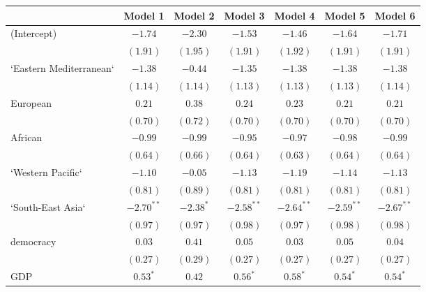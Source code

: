 
\begin{table}[!h]
\begin{center}
\begin{tabular}{l c c c c c c }
\toprule
 & Model 1 & Model 2 & Model 3 & Model 4 & Model 5 & Model 6 \\
\midrule
(Intercept)             & $-1.74$      & $-2.30$      & $-1.53$      & $-1.46$      & $-1.64$      & $-1.71$      \\
                        & $(1.91)$     & $(1.95)$     & $(1.91)$     & $(1.92)$     & $(1.91)$     & $(1.91)$     \\
`Eastern Mediterranean` & $-1.38$      & $-0.44$      & $-1.35$      & $-1.38$      & $-1.38$      & $-1.38$      \\
                        & $(1.14)$     & $(1.14)$     & $(1.13)$     & $(1.13)$     & $(1.13)$     & $(1.14)$     \\
European                & $0.21$       & $0.38$       & $0.24$       & $0.23$       & $0.21$       & $0.21$       \\
                        & $(0.70)$     & $(0.72)$     & $(0.70)$     & $(0.70)$     & $(0.70)$     & $(0.70)$     \\
African                 & $-0.99$      & $-0.99$      & $-0.95$      & $-0.97$      & $-0.98$      & $-0.99$      \\
                        & $(0.64)$     & $(0.66)$     & $(0.64)$     & $(0.63)$     & $(0.64)$     & $(0.64)$     \\
`Western Pacific`       & $-1.10$      & $-0.05$      & $-1.13$      & $-1.19$      & $-1.14$      & $-1.13$      \\
                        & $(0.81)$     & $(0.89)$     & $(0.81)$     & $(0.81)$     & $(0.81)$     & $(0.81)$     \\
`South-East Asia`       & $-2.70^{**}$ & $-2.38^{*}$  & $-2.58^{**}$ & $-2.64^{**}$ & $-2.59^{**}$ & $-2.67^{**}$ \\
                        & $(0.97)$     & $(0.97)$     & $(0.98)$     & $(0.97)$     & $(0.98)$     & $(0.98)$     \\
democracy               & $0.03$       & $0.41$       & $0.05$       & $0.03$       & $0.05$       & $0.04$       \\
                        & $(0.27)$     & $(0.29)$     & $(0.27)$     & $(0.27)$     & $(0.27)$     & $(0.27)$     \\
GDP                     & $0.53^{*}$   & $0.42$       & $0.56^{*}$   & $0.58^{*}$   & $0.54^{*}$   & $0.54^{*}$   \\

\end{tabular}
\end{center}
\end{table}
